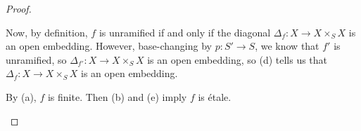 \documentclass{amsart}
\begin{document}
\begin{proof}
\begin{listalph}
        Now, by definition, $f$ is unramified if and only if the diagonal $\Delta_f\colon X\to X\times_SX$ is an open embedding. However, base-changing by $p\colon S'\to S$, we know that $f'$ is unramified, so $\Delta_{f'}\colon X\to X\times_SX$ is an open embedding, so (d) tells us that $\Delta_f\colon X\to X\times_SX$ is an open embedding.
        \item By (a), $f$ is finite. Then (b) and (e) imply $f$ is \'etale.
        \qedhere
    \end{listalph}
\end{proof}
    

    
    
    
\end{document}
